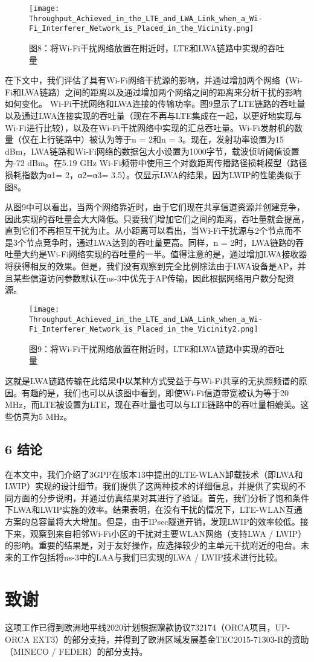 \begin{figure}[htb]
  \centering
  \texttt{[image: Throughput\_Achieved\_in\_the\_LTE\_and\_LWA\_Link\_when\_a\_Wi-Fi\_Interferer\_Network\_is\_Placed\_in\_the\_Vicinity.png]}
  \caption*{图8：将Wi-Fi干扰网络放置在附近时，LTE和LWA链路中实现的吞吐量}
\end{figure}

在下文中，我们评估了具有Wi-Fi网络干扰源的影响，并通过增加两个网络（Wi-Fi和LWA链路）之间的距离以及通过增加两个网络之间的距离来分析干扰的影响如何变化。 Wi-Fi干扰网络和LWA连接的传输功率。图9显示了LTE链路的吞吐量以及通过LWA连接实现的吞吐量（现在不再与LTE集成在一起，以更好地实现与Wi-Fi进行比较），以及在Wi-Fi干扰网络中实现的汇总吞吐量。Wi-Fi发射机的数量（仅在上行链路中）被认为等于n = 2和n = 3。现在，发射功率设置为15 dBm，LWA链路和Wi-Fi网络的数据包大小设置为1000字节，载波侦听阈值设置为-72 dBm。在5.19 GHz Wi-Fi频带中使用三个对数距离传播路径损耗模型（路径损耗指数为α1= 2，α2=α3= 3.5）。仅显示LWA的结果，因为LWIP的性能类似于图8。

从图9中可以看出，当两个网络靠近时，由于它们现在共享信道资源并创建竞争，因此实现的吞吐量会大大降低。只要我们增加它们之间的距离，吞吐量就会提高，直到它们不再相互干扰为止。从小距离可以看出，当Wi-Fi干扰源与2个节点而不是3个节点竞争时，通过LWA达到的吞吐量更高。同样，n = 2时，LWA链路的吞吐量大约是Wi-Fi网络实现的吞吐量的一半。值得注意的是，通过增加LWA接收器将获得相反的效果。但是，我们没有观察到完全比例除法由于LWA设备是AP，并且某些信道访问参数默认在ns-3中优先于AP传输，因此根据网络用户数分配资源。

\begin{figure}[htb]
  \centering
  \texttt{[image: Throughput\_Achieved\_in\_the\_LTE\_and\_LWA\_Link\_when\_a\_Wi-Fi\_Interferer\_Network\_is\_Placed\_in\_the\_Vicinity2.png]}
  \caption*{图9：将Wi-Fi干扰网络放置在附近时，LTE和LWA链路中实现的吞吐量}
\end{figure}

这就是LWA链路传输在此结果中以某种方式受益于与Wi-Fi共享的无执照频谱的原因。有趣的是，我们也可以从该图中看到，即使Wi-Fi信道带宽被认为等于20 MHz，而LTE被设置为LTE，现在吞吐量也可以与LTE链路中的吞吐量相媲美。这些仿真为5 MHz。

\newpage
\section*{6 结论}
在本文中，我们介绍了3GPP在版本13中提出的LTE-WLAN卸载技术（即LWA和LWIP）实现的设计细节。我们提供了这两种技术的详细信息，并提供了实现的不同方面的分步说明，并通过仿真结果对其进行了验证。首先，我们分析了饱和条件下LWA和LWIP实施的效率。结果表明，在没有干扰的情况下，LTE-WLAN互通方案的总容量将大大增加。但是，由于IPsec隧道开销，发现LWIP的效率较低。接下来，观察到来自相邻Wi-Fi小区的干扰对主要WLAN网络（支持LWA / LWIP）的影响。重要的结果是，对于友好操作，应选择较少的主单元干扰附近的电台。未来的工作包括将ns-3中的LAA与我们已实现的LWA / LWIP技术进行比较。

\chapter{致谢}
这项工作已得到欧洲地平线2020计划根据赠款协议732174（ORCA项目，UP-ORCA EXT3）的部分支持，并得到了欧洲区域发展基金TEC2015-71303-R的资助（MINECO / FEDER）的部分支持。



